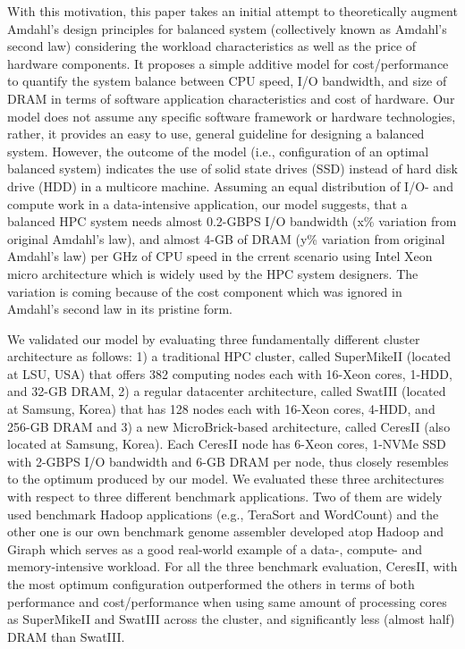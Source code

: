\documentclass[journal]{IEEEtran}
\begin{document}
With this motivation, this paper takes an initial attempt to theoretically augment Amdahl's design principles for balanced system (collectively known as Amdahl's second law)  considering the workload characteristics as well as the price of hardware components. It proposes a simple additive model for cost/performance to quantify the system balance between CPU speed, I/O bandwidth, and size of DRAM in terms of software application characteristics and cost of hardware. Our model does not assume any specific software framework or hardware technologies, rather, it provides an easy to use, general guideline for designing a balanced system. However, the outcome of the model (i.e., configuration of an optimal balanced system) indicates the use of solid state drives (SSD) instead of hard disk drive (HDD) in a multicore machine. Assuming an equal distribution of I/O-  and compute work in a data-intensive application, our model suggests, that a balanced HPC system needs almost 0.2-GBPS I/O bandwidth (x\% variation from original Amdahl's law), and almost 4-GB of DRAM (y\% variation from original Amdahl's law) per GHz of CPU speed in the crrent scenario using Intel Xeon micro architecture which is widely used by the HPC system designers. The variation is coming because of the cost component which was ignored in Amdahl's second law in its pristine form. 


We validated our model by evaluating three fundamentally different cluster architecture as follows: 1) a traditional HPC cluster, called SuperMikeII (located at LSU, USA) that offers 382 computing nodes each with 16-Xeon cores, 1-HDD, and 32-GB DRAM, 2) a regular datacenter architecture, called SwatIII (located at Samsung, Korea) that has 128 nodes each with 16-Xeon cores, 4-HDD, and 256-GB DRAM and 3) a new MicroBrick-based architecture, called CeresII (also located at Samsung, Korea). Each CeresII node has  6-Xeon cores, 1-NVMe SSD  with 2-GBPS I/O bandwidth and 6-GB DRAM per node, thus closely resembles to the optimum produced by our model. We evaluated these three architectures with respect to three different benchmark applications. Two of them are widely  used benchmark Hadoop applications (e.g., TeraSort and WordCount) and the other one is our own benchmark genome assembler developed atop Hadoop and Giraph which serves as a good real-world example of a data-, compute- and memory-intensive workload. For all the three benchmark evaluation, CeresII, with the most optimum configuration outperformed the others in terms of both performance and cost/performance when using same amount of processing cores as SuperMikeII and SwatIII across the cluster, and significantly less (almost half) DRAM than SwatIII. 
\end{document}
